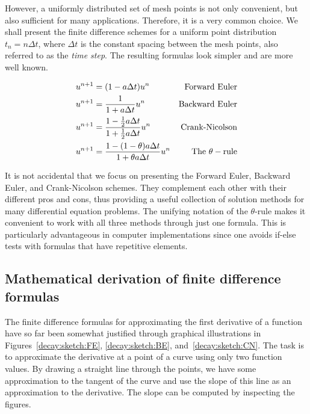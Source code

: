 \documentclass[%
oneside,                 %
final,                   %
10pt]{article}
\newenvironment{summary_mdfboxadmon}[1][]{
\begin{summary_mdfboxmdframed}[frametitle=#1]
}
{
\end{summary_mdfboxmdframed}
}
\begin{document}

However, a uniformly distributed set of mesh points is not only
convenient, but also
sufficient for many applications. Therefore, it is a very common
choice. We shall
present the finite difference schemes for a uniform point distribution
$t_n=n\Delta t$, where $\Delta t$ is the constant spacing between
the mesh points, also referred to as the \emph{time step}.
The resulting formulas look simpler and are more
well known.


\begin{summary_mdfboxadmon}
\begin{alignat}{2}
u^{n+1} &= (1 - a\Delta t )u^n  & \hbox{Forward Euler}
\label{decay:FE:u}\\ 
u^{n+1} &= \frac{1}{1+ a\Delta t} u^n  & \hbox{Backward Euler}
\label{decay:BE:u}\\ 
u^{n+1} &= \frac{1-\frac{1}{2} a\Delta t}{1 + \frac{1}{2} a\Delta t} u^n & \hbox{Crank-Nicolson}
\label{decay:CN:u}\\ 
u^{n+1} &= \frac{1 - (1-\theta) a\Delta t}{1 + \theta a \Delta t}u^n  & \hbox{The }\theta-\hbox{rule}
\label{decay:th:u}
\end{alignat}
\end{summary_mdfboxadmon}



It is not accidental that we focus on presenting the Forward Euler, Backward
Euler, and Crank-Nicolson schemes. They complement each other with their
different pros and cons, thus providing a useful collection of
solution methods for many differential equation problems.
The unifying notation of the $\theta$-rule makes it convenient to
work with all three methods through just one formula. This is
particularly advantageous in computer implementations since one avoids
if-else tests with formulas that have repetitive elements.


\subsection{Mathematical derivation of finite difference formulas}
\label{decay:fd:taylor}

The finite difference formulas for approximating the first derivative
of a function have so far been somewhat justified through graphical
illustrations in Figures~\ref{decay:sketch:FE}, \ref{decay:sketch:BE},
and~\ref{decay:sketch:CN}. The task is to approximate the derivative
at a point of a curve using only two function values. By drawing
a straight line through the points, we have some approximation to
the tangent of the curve and use the slope of this line as
an approximation to the derivative. The slope can be computed by
inspecting the figures.
\end{document}
